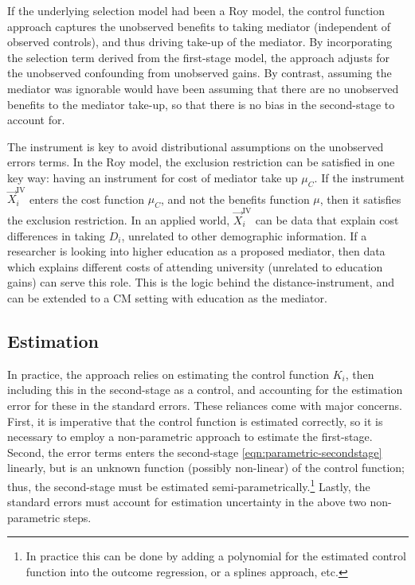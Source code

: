 If the underlying selection model had been a Roy model, the control function approach captures the unobserved benefits to taking mediator (independent of observed controls), and thus driving take-up of the mediator.
By incorporating the selection term derived from the first-stage model, the approach adjusts for the unobserved confounding from unobserved gains.
By contrast, assuming the mediator was ignorable would have been assuming that there are no unobserved benefits to the mediator take-up, so that there is no bias in the second-stage to account for.

The instrument is key to avoid distributional assumptions on the unobserved errors terms.
In the Roy model, the exclusion restriction can be satisfied in one key way: having an instrument for cost of mediator take up $\mu_C$.
If the instrument $\vec X_i^{\text{IV}}$ enters the cost function $\mu_C$, and not the benefits function $\mu$, then it satisfies the exclusion restriction.
In an applied world, $\vec X_i^{\text{IV}}$ can be data that explain cost differences in taking $D_i$, unrelated to other demographic information.
If a researcher is looking into higher education as a proposed mediator, then data which explains different costs of attending university (unrelated to education gains) can serve this role.
This is the logic behind the \cite{card1993using} distance-instrument, and can be extended to a CM setting with education as the mediator.


\subsection{Estimation}
In practice, the approach relies on estimating the control function $K_i$, then including this in the second-stage as a control, and accounting for the estimation error for these in the standard errors.
These reliances come with major concerns.
First, it is imperative that the control function is estimated correctly, so it is necessary to employ a non-parametric approach to estimate the first-stage.
Second, the error terms enters the second-stage \eqref{eqn:parametric-secondstage} linearly, but is an unknown function (possibly non-linear) of the control function; thus, the second-stage must be estimated semi-parametrically.\footnote{
    In practice this can be done by adding a polynomial for the estimated control function into the outcome regression, or a splines approach, etc. 
}
Lastly, the standard errors must account for estimation uncertainty in the above two non-parametric steps.

